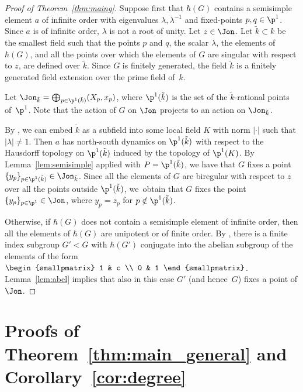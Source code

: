 \begin{proof}[Proof of Theorem~\ref{thm:maing}]
Suppose first that $\hbar(G)$ contains a semisimple element $a$ of infinite order with eigenvalues $\lambda, \lambda^{-1}$ and fixed-points $p,q\in \p^1$. Since $a$ is of infinite order, $\lambda$ is not a root of unity. Let $z\in \Jon$. Let $\tilde{k}\subset k$ be the smallest field such that the points $p$ and $q$, the scalar $\lambda$, the elements of $\hbar(G)$, and all the points over which the elements of $G$ are singular with respect to $z$, are defined over $\tilde{k}$. Since $G$ is finitely generated, the field $\tilde{k}$ is a finitely generated field extension over the prime field of~$k$.

Let $\Jon_{\tilde{k}}=\bigoplus_{p\in \p^1(\tilde{k})} (X_p,x_p)$, where $\p^1(\tilde{k})$ is the set of the $\tilde k$-rational points of~$\p^1$. Note that the action of $G$ on $\Jon$ projects to an action on $\Jon_{\tilde{k}}$.

By \cite[Th.\,2.65]{drutukapovich}, we can embed $\tilde{k}$ as a subfield into some local field $K$ with norm $|\cdot|$ such that $|\lambda|\neq 1$. Then $a$ has north-south dynamics on $\p^1(\tilde{k})$ with respect to the Hausdorff topology on $\p^1(\tilde{k})$ induced by the topology of $\p^1(K)$. By Lemma~\ref{lem:semisimple} applied with $P=\p^1(\tilde{k})$, we have that $G$ fixes a point $\{y_p\}_{p\in\p^1(\tilde{k})}\in\Jon_{\tilde{k}}$. Since all the elements of $G$ are biregular with respect to $z$ over all the points outside $\p^1(\tilde{k})$, we~obtain that $G$ fixes the point $\{y_p\}_{p\in \p^1}\in\Jon$, where $y_p=z_p$ for $p\notin\p^1(\tilde{k})$.

Otherwise, if $\hbar(G)$ does not contain a semisimple element of infinite order, then all the elements of $\hbar(G)$ are unipotent or of finite order. By \cite[Prop.\,14.46]{drutukapovich}, there is a finite index subgroup $G'<G$ with $\hbar(G')$ conjugate into the abelian subgroup of the elements of the form $\begin{smallpmatrix}
1 & c \\
0 & 1
\end{smallpmatrix}$.
Lemma~\ref{lem:abel} implies that also in this case $G'$ (and hence~$G$) fixes a point of $\Jon$.
\end{proof}

{\section{Proofs of Theorem~\ref{thm:main_general} and Corollary~\ref{cor:degree}}}

